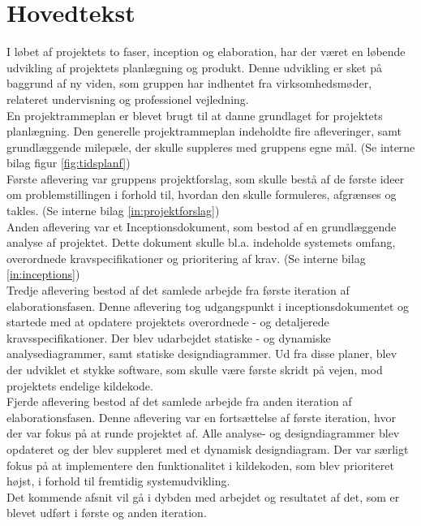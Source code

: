 \chapter{Hovedtekst}
I løbet af projektets to faser, inception og elaboration, har der været en løbende udvikling af projektets planlægning og produkt. Denne udvikling er sket på baggrund af ny viden, som gruppen har indhentet fra virksomhedsmøder, relateret undervisning og professionel vejledning. \\
En projektrammeplan er blevet brugt til at danne grundlaget for projektets planlægning. Den generelle projektrammeplan indeholdte fire afleveringer, samt grundlæggende milepæle, der skulle suppleres med gruppens egne mål. 
(Se interne bilag figur \ref{fig:tidsplanf}) \\
Første aflevering var gruppens projektforslag, som skulle bestå af de første ideer om problemstillingen i forhold til, hvordan den skulle formuleres, afgrænses og takles. (Se interne bilag \ref{in:projektforslag})\\
Anden aflevering var et Inceptionsdokument, som bestod af en grundlæggende analyse af projektet. Dette dokument skulle bl.a. indeholde systemets omfang, overordnede kravspecifikationer og prioritering af krav. (Se interne bilag \ref{in:inceptions})\\
Tredje aflevering bestod af det samlede arbejde fra første iteration af elaborationsfasen. Denne aflevering tog udgangspunkt i inceptionsdokumentet og startede med at opdatere projektets overordnede - og detaljerede kravsspecifikationer. Der blev udarbejdet statiske - og dynamiske analysediagrammer, samt statiske designdiagrammer. Ud fra disse planer, blev der udviklet et stykke software, som skulle være første skridt på vejen, mod projektets endelige kildekode.\\
Fjerde aflevering bestod af det samlede arbejde fra anden iteration af elaborationsfasen. Denne aflevering var en fortsættelse af første iteration, hvor der var fokus på at runde projektet af. Alle analyse- og designdiagrammer blev opdateret og der blev suppleret med et dynamisk designdiagram. Der var særligt fokus på at implementere den funktionalitet i kildekoden, som blev prioriteret højst, i forhold til fremtidig systemudvikling.\\
Det kommende afsnit vil gå i dybden med arbejdet og resultatet af det, som er blevet udført i første og anden iteration.

